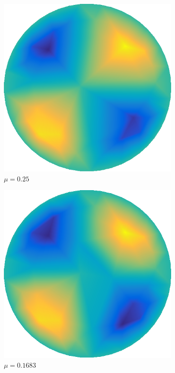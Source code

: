 \documentclass[../fem.tex]{subfile}
\begin{document}
\begin{figure}[htpb]
  \centering
  \begin{subfigure}{0.4\textwidth}
    \centering
    \includegraphics[width=0.8\linewidth]{figures/c1/approx.png}
    \caption{$\mu=0.25$}
  \end{subfigure}
  \begin{subfigure}{0.4\textwidth}
    \centering
    \includegraphics[width=0.8\linewidth]{figures/c2/approx.png}
    \caption{$\mu=0.1683$}
  \end{subfigure}
  \begin{subfigure}{0.4\textwidth}

\end{subfigure}
\end{figure}
\end{document}
